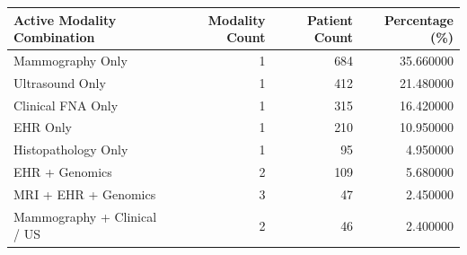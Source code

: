 \begin{tabular}{lrrr}
\toprule
Active Modality Combination & Modality Count & Patient Count & Percentage (\%) \\
\midrule
Mammography Only & 1 & 684 & 35.660000 \\
Ultrasound Only & 1 & 412 & 21.480000 \\
Clinical FNA Only & 1 & 315 & 16.420000 \\
EHR Only & 1 & 210 & 10.950000 \\
Histopathology Only & 1 & 95 & 4.950000 \\
EHR + Genomics & 2 & 109 & 5.680000 \\
MRI + EHR + Genomics & 3 & 47 & 2.450000 \\
Mammography + Clinical / US & 2 & 46 & 2.400000 \\
\bottomrule
\end{tabular}
